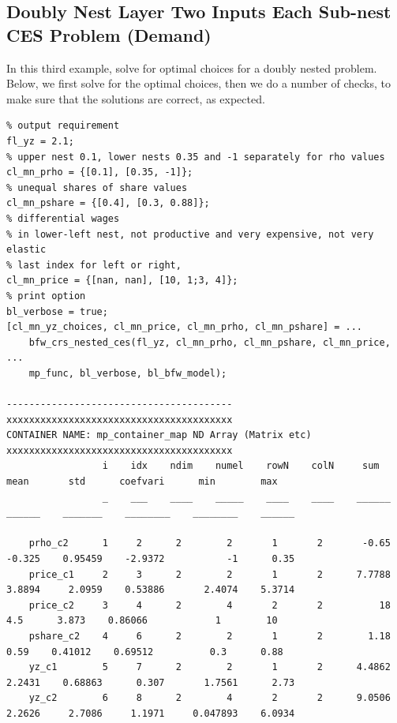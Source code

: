 \documentclass[
]{book}
\begin{document}
\hypertarget{doubly-nest-layer-two-inputs-each-sub-nest-ces-problem-demand}{%
\subsection{Doubly Nest Layer Two Inputs Each Sub-nest CES Problem (Demand)}\label{doubly-nest-layer-two-inputs-each-sub-nest-ces-problem-demand}}

In this third example, solve for optimal choices for a doubly nested
problem. Below, we first solve for the optimal choices, then we do a
number of checks, to make sure that the solutions are correct, as
expected.

\begin{verbatim}
% output requirement
fl_yz = 2.1;
% upper nest 0.1, lower nests 0.35 and -1 separately for rho values
cl_mn_prho = {[0.1], [0.35, -1]};
% unequal shares of share values
cl_mn_pshare = {[0.4], [0.3, 0.88]};
% differential wages
% in lower-left nest, not productive and very expensive, not very elastic
% last index for left or right,
cl_mn_price = {[nan, nan], [10, 1;3, 4]};
% print option
bl_verbose = true;
[cl_mn_yz_choices, cl_mn_price, cl_mn_prho, cl_mn_pshare] = ...
    bfw_crs_nested_ces(fl_yz, cl_mn_prho, cl_mn_pshare, cl_mn_price, ...
    mp_func, bl_verbose, bl_bfw_model);

----------------------------------------
xxxxxxxxxxxxxxxxxxxxxxxxxxxxxxxxxxxxxxxx
CONTAINER NAME: mp_container_map ND Array (Matrix etc)
xxxxxxxxxxxxxxxxxxxxxxxxxxxxxxxxxxxxxxxx
                 i    idx    ndim    numel    rowN    colN     sum       mean       std      coefvari      min        max  
                 _    ___    ____    _____    ____    ____    ______    ______    _______    ________    ________    ______

    prho_c2      1     2      2        2       1       2       -0.65    -0.325    0.95459    -2.9372           -1      0.35
    price_c1     2     3      2        2       1       2      7.7788    3.8894     2.0959    0.53886       2.4074    5.3714
    price_c2     3     4      2        4       2       2          18       4.5      3.873    0.86066            1        10
    pshare_c2    4     6      2        2       1       2        1.18      0.59    0.41012    0.69512          0.3      0.88
    yz_c1        5     7      2        2       1       2      4.4862    2.2431    0.68863      0.307       1.7561      2.73
    yz_c2        6     8      2        4       2       2      9.0506    2.2626     2.7086     1.1971     0.047893    6.0934


\end{verbatim}
\end{document}
